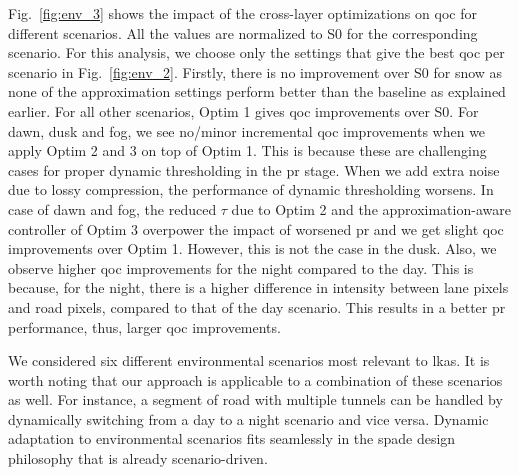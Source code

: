 \par Fig.\ \ref{fig:env_3} shows the impact of the cross-layer optimizations on \gls{qoc} for different scenarios. All the values are normalized to S0 for the corresponding scenario. For this analysis, we choose only the settings that give the best \gls{qoc} per scenario in Fig.\ \ref{fig:env_2}. Firstly, there is no improvement over S0 for snow as none of the approximation settings perform better than the baseline as explained earlier. For all other scenarios, Optim 1 gives \gls{qoc} improvements over S0. For dawn, dusk and fog, we see no/minor incremental \gls{qoc} improvements when we apply Optim 2 and 3 on top of Optim 1. This is because these are challenging cases for proper dynamic thresholding in the \gls{pr} stage. When we add extra noise due to lossy compression, the performance of dynamic thresholding worsens. In case of dawn and fog, the reduced $\tau$ due to Optim 2 and the approximation-aware controller of Optim 3 overpower the impact of worsened \gls{pr} and we get slight \gls{qoc} improvements over Optim 1. However, this is not the case in the dusk. Also, we observe higher \gls{qoc} improvements for the night compared to the day. This is because, for the night, there is a higher difference in intensity between lane pixels and road pixels, compared to that of the day scenario. This results in a better \gls{pr} performance, thus, larger \gls{qoc} improvements.

We considered six different environmental scenarios most relevant to \gls{lkas}. It is worth noting that our approach is applicable to a combination of these scenarios as well. For instance, a segment of road with multiple tunnels can be handled by dynamically switching from a day to a night scenario and vice versa. Dynamic adaptation to environmental scenarios fits seamlessly in the \gls{spade} design philosophy that is already scenario-driven.